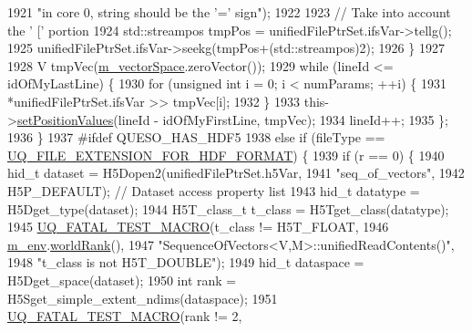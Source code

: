 \begin{DoxyCode}
1921                                   \textcolor{stringliteral}{"in core 0, string should be the '=' sign"});
1922 
1923               \textcolor{comment}{// Take into account the ' [' portion}
1924         std::streampos tmpPos = unifiedFilePtrSet.ifsVar->tellg();
1925               unifiedFilePtrSet.ifsVar->seekg(tmpPos+(std::streampos)2);
1926             \}
1927 
1928             V tmpVec(\hyperlink{class_q_u_e_s_o_1_1_base_vector_sequence_a4bd171e39ed050ff105c808336f35198}{m\_vectorSpace}.zeroVector());
1929             \textcolor{keywordflow}{while} (lineId <= idOfMyLastLine) \{
1930               \textcolor{keywordflow}{for} (\textcolor{keywordtype}{unsigned} \textcolor{keywordtype}{int} i = 0; i < numParams; ++i) \{
1931                 *unifiedFilePtrSet.ifsVar >> tmpVec[i];
1932               \}
1933               this->\hyperlink{class_q_u_e_s_o_1_1_sequence_of_vectors_a822aecb4ddeb8da89683f6c3a1ce11c1}{setPositionValues}(lineId - idOfMyFirstLine, tmpVec);
1934               lineId++;
1935             \};
1936           \}
1937 \textcolor{preprocessor}{#ifdef QUESO\_HAS\_HDF5}
1938 \textcolor{preprocessor}{}          \textcolor{keywordflow}{else} \textcolor{keywordflow}{if} (fileType == \hyperlink{_defines_8h_a4ebcc075277d031eb97c90b9a45f4493}{UQ\_FILE\_EXTENSION\_FOR\_HDF\_FORMAT}) \{
1939             \textcolor{keywordflow}{if} (r == 0) \{
1940               hid\_t dataset = H5Dopen2(unifiedFilePtrSet.h5Var,
1941                                        \textcolor{stringliteral}{"seq\_of\_vectors"},
1942                                        H5P\_DEFAULT); \textcolor{comment}{// Dataset access property list }
1943               hid\_t datatype  = H5Dget\_type(dataset);
1944               H5T\_class\_t t\_class = H5Tget\_class(datatype);
1945               \hyperlink{_defines_8h_a56d63d18d0a6d45757de47fcc06f574d}{UQ\_FATAL\_TEST\_MACRO}(t\_class != H5T\_FLOAT,
1946                                   \hyperlink{class_q_u_e_s_o_1_1_base_vector_sequence_a8e8824d2a63c5a43bcc6473e3a0491e8}{m\_env}.\hyperlink{class_q_u_e_s_o_1_1_base_environment_a78b57112bbd0e6dd0e8afec00b40ffa7}{worldRank}(),
1947                                   \textcolor{stringliteral}{"SequenceOfVectors<V,M>::unifiedReadContents()"},
1948                                   \textcolor{stringliteral}{"t\_class is not H5T\_DOUBLE"});
1949               hid\_t dataspace = H5Dget\_space(dataset);
1950               \textcolor{keywordtype}{int}   rank      = H5Sget\_simple\_extent\_ndims(dataspace);
1951               \hyperlink{_defines_8h_a56d63d18d0a6d45757de47fcc06f574d}{UQ\_FATAL\_TEST\_MACRO}(rank != 2,

\end{DoxyCode}
